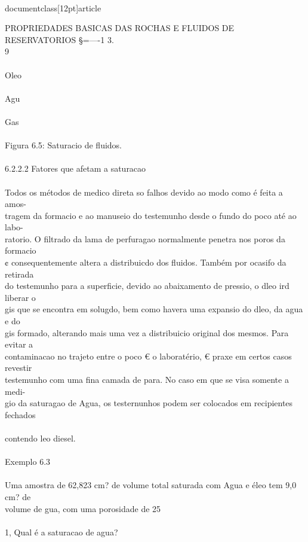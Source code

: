 \\documentclass[12pt]{article}
\begin{document}
PROPRIEDADES BASICAS DAS ROCHAS E FLUIDOS DE RESERVATORIOS §=—-1 3.\\
9\\
\\
Oleo\\
\\
Agu\\
\\
Gas\\
\\
Figura 6.5: Saturacio de fluidos.\\
\\
6.2.2.2 Fatores que afetam a saturacao\\
\\
Todos os métodos de medico direta so falhos devido ao modo como é feita a amos-\\
tragem da formacio e ao manuseio do testemunho desde o fundo do poco até ao labo-\\
ratorio. O filtrado da lama de perfuragao normalmente penetra nos poros da formacio\\
¢ consequentemente altera a distribuicdo dos fluidos. Também por ocasifo da retirada\\
do testemunho para a superficie, devido ao abaixamento de pressio, o dleo ird liberar o\\
gis que se encontra em solugdo, bem como havera uma expansio do dleo, da agua e do\\
gis formado, alterando mais uma vez a distribuicio original dos mesmos. Para evitar a\\
contaminacao no trajeto entre o poco € o laboratério, € praxe em certos casos revestir\\
 testemunho com uma fina camada de para. No caso em que se visa somente a medi-\\
gio da saturagao de Agua, os testernunhos podem ser colocados em recipientes fechados\\
\\
contendo leo diesel.\\
\\
Exemplo 6.3\\
\\
Uma amostra de 62,823 cm? de volume total saturada com Agua e éleo tem 9,0 cm? de\\
volume de gua, com uma porosidade de 25\\%
\\
1, Qual é a saturacao de agua?\\
\\
\end{document}
